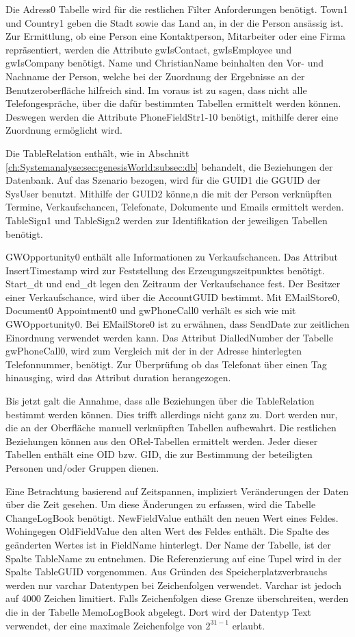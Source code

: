 Die Adress0 Tabelle wird für die restlichen Filter Anforderungen benötigt. Town1 und Country1 geben die Stadt sowie das Land an, in der die Person ansässig ist. Zur Ermittlung, ob eine Person eine Kontaktperson, Mitarbeiter oder eine Firma repräsentiert, werden die Attribute gwIsContact, gwIsEmployee und gwIsCompany benötigt. Name und ChristianName beinhalten den Vor- und Nachname der Person, welche bei der Zuordnung der Ergebnisse an der Benutzeroberfläche hilfreich sind. Im voraus ist zu sagen, dass nicht alle Telefongespräche, über die dafür bestimmten Tabellen ermittelt werden können. Deswegen werden die Attribute PhoneFieldStr1-10 benötigt, mithilfe derer eine Zuordnung ermöglicht wird. 

Die TableRelation enthält, wie in Abschnitt \ref{ch:Systemanalyse:sec:genesisWorld:subsec:db} behandelt, die Beziehungen der Datenbank. Auf das Szenario bezogen, wird für die GUID1 die GGUID der SysUser benutzt. Mithilfe der GUID2 könne,n die mit der Person verknüpften Termine, Verkaufschancen, Telefonate, Dokumente und Emails ermittelt werden. TableSign1 und TableSign2 werden zur Identifikation der jeweiligen Tabellen benötigt.

GWOpportunity0 enthält alle Informationen zu Verkaufschancen. Das Attribut InsertTimestamp wird zur Feststellung des Erzeugungszeitpunktes benötigt. Start\_dt und end\_dt legen den Zeitraum der Verkaufschance fest. Der Besitzer einer Verkaufschance, wird über die AccountGUID bestimmt. Mit EMailStore0, Document0 Appointment0 und gwPhoneCall0 verhält es sich wie mit GWOpportunity0. Bei EMailStore0 ist zu erwähnen, dass SendDate zur zeitlichen Einordnung verwendet werden kann. Das Attribut DialledNumber der Tabelle gwPhoneCall0, wird zum Vergleich  mit der in der Adresse hinterlegten Telefonnummer, benötigt. Zur Überprüfung ob das Telefonat über einen Tag hinausging, wird das Attribut duration herangezogen.

Bis jetzt galt die Annahme, dass alle Beziehungen über die TableRelation bestimmt werden können. Dies trifft allerdings nicht ganz zu. Dort werden nur, die an der Oberfläche manuell verknüpften Tabellen aufbewahrt. Die restlichen Beziehungen können aus den ORel-Tabellen ermittelt werden. Jeder dieser Tabellen enthält eine OID bzw. GID, die zur Bestimmung der beteiligten Personen und/oder Gruppen dienen.

Eine Betrachtung basierend auf Zeitspannen, impliziert Veränderungen der Daten über die Zeit gesehen. Um diese Änderungen zu erfassen, wird die Tabelle ChangeLogBook benötigt. NewFieldValue enthält den neuen Wert eines Feldes. Wohingegen OldFieldValue den alten Wert des Feldes enthält. Die Spalte des geänderten Wertes ist in FieldName hinterlegt. Der Name der Tabelle, ist der Spalte TableName zu entnehmen. Die Referenzierung auf eine Tupel wird in der Spalte TableGUID vorgenommen. Aus Gründen des Speicherplatzverbrauchs werden nur varchar Datentypen bei Zeichenfolgen verwendet. Varchar ist jedoch auf 4000 Zeichen limitiert. Falls Zeichenfolgen diese Grenze überschreiten, werden die in der Tabelle MemoLogBook abgelegt. Dort wird der Datentyp Text verwendet, der eine maximale Zeichenfolge von $2^{31-1}$  erlaubt.